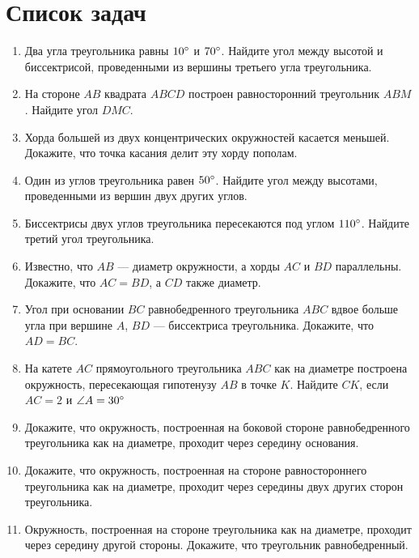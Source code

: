 \documentclass[12pt, a4paper]{article}
\begin{document}
\section{Список задач}
\begin{enumerate}
	\item Два угла треугольника равны $10\degree$ и $70\degree$. Найдите угол между высотой и биссектрисой, проведенными из вершины третьего угла треугольника.
	\item На стороне $AB$ квадрата $ABCD$ построен равносторонний треугольник $ABM$. Найдите угол $DMC$.
	\item Хорда большей из двух концентрических окружностей касается меньшей. Докажите, что точка касания делит эту хорду пополам.
	\item Один из углов треугольника равен $50\degree$. Найдите угол между высотами, проведенными из вершин двух других углов.
	\item Биссектрисы двух углов треугольника пересекаются под углом $110\degree$. Найдите третий угол треугольника.
	\item Известно, что $AB$ — диаметр окружности, а хорды $AC$ и $BD$ параллельны. Докажите, что $AC = BD$, а $CD$ также диаметр.
	\item Угол при основании $BC$ равнобедренного треугольника $ABC$ вдвое больше угла при вершине $A$, $BD$ — биссектриса треугольника. Докажите, что $AD = BC$.
	\item На катете $AC$ прямоугольного треугольника $ABC$ как на диаметре построена окружность, пересекающая гипотенузу $AB$ в точке $K$. Найдите $CK$, если $AC = 2$ и $\angle A = 30\degree$
	\item Докажите, что окружность, построенная на боковой стороне равнобедренного треугольника как на диаметре, проходит через середину основания.
	\item Докажите, что окружность, построенная на стороне равностороннего треугольника как на диаметре, проходит через середины двух других сторон треугольника.
	\item Окружность, построенная на стороне треугольника как на диаметре, проходит через середину другой стороны. Докажите, что треугольник равнобедренный.
	
\end{enumerate}
\end{document}
